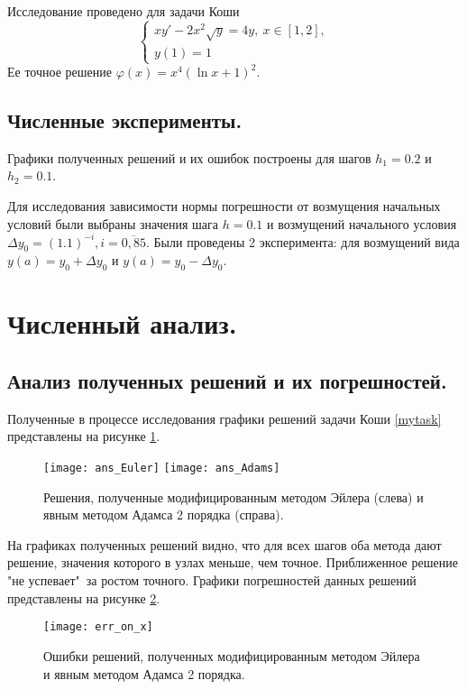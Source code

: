 \documentclass[a4paper, 12pt]{article}
\theoremstyle{mythm}
\begin{document}
	Исследование проведено для задачи Коши
	\begin{equation} \label{mytask}
		\begin{cases}
			xy'-2x^2\sqrt{y}=4y,\ x\in[1,2],\\
			y(1)=1
		\end{cases}
	\end{equation}
	Ее точное решение $\varphi(x)=x^4(\ln x+1)^2$.
	
	\subsection{Численные эксперименты.}
	
	Графики полученных решений и их ошибок построены для шагов $h_1=0.2$ и $h_2=0.1$.
	
	Для исследования зависимости нормы погрешности от возмущения начальных условий были выбраны значения шага $h=0.1$ и возмущений начального условия $\Delta y_0=(1.1)^{-i}, i=\overline{0,85}$. Были проведены 2 эксперимента: для возмущений вида $y(a)=y_0+\Delta y_0$ и $y(a)=y_0-\Delta y_0$. 
	
	\section{Численный анализ.}
	
	\subsection{Анализ полученных решений и их погрешностей.} \label{analysis:ans}
	
	Полученные в процессе исследования графики решений задачи Коши \eqref{mytask} представлены на рисунке \ref{fig:ans}.
	
	\begin{figure}[H]\centering
		\texttt{[image: ans\_Euler]}
		\texttt{[image: ans\_Adams]}
		\caption{Решения, полученные модифицированным методом Эйлера (слева) и явным методом Адамса 2 порядка (справа).}\label{fig:ans}
	\end{figure}

	На графиках полученных решений видно, что для всех шагов оба метода дают решение, значения которого в узлах меньше, чем точное. Приближенное решение "не успевает"\ за ростом точного. Графики погрешностей данных решений представлены на рисунке \ref{fig:err}.
	
	\begin{figure}[H]\centering
		\texttt{[image: err\_on\_x]}
		\caption{Ошибки решений, полученных модифицированным методом Эйлера и явным методом Адамса 2 порядка.}\label{fig:err}
	\end{figure}
\end{document}
